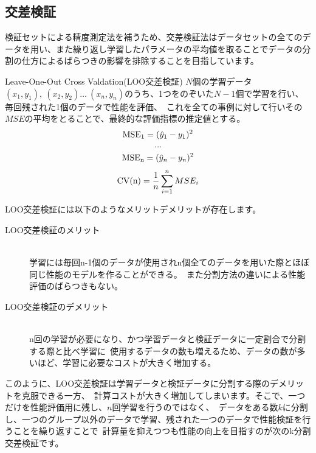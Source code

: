 \documentclass[uplatex]{jsarticle}
\begin{document}
\subsection{交差検証}
検証セットによる精度測定法を補うため、交差検証法はデータセットの全てのデータを用い、また繰り返し学習したパラメータの平均値を取ることでデータの分割の仕方によるばらつきの影響を排除することを目指しています。
\begin{itembox}[l]{Leave-One-Out Cross Valdation(LOO交差検証)}
  $N$個の学習データ${(x_1, y_1),\ (x_2, y_2) \ldots\ (x_n, y_n)}$のうち、1つをのぞいた$N-1$個で学習を行い、毎回残された1個のデータで性能を評価、\
  これを全ての事例に対して行いその$MSE$の平均をとることで、最終的な評価指標の推定値とする。\\
  $$ {\rm MSE_1} = (\hat{y}_1-y_1)^2$$
  $$\dots$$
  $$ {\rm MSE_n} = (\hat{y}_n-y_n)^2$$
  $$ {\rm CV(n)} = \frac{1}{n}\sum_{i=1}^n MSE_i$$
\end{itembox}
LOO交差検証には以下のようなメリットデメリットが存在します。
  \begin{description}
    \item [LOO交差検証のメリット]\mbox{}\\
    学習には毎回n-1個のデータが使用されn個全てのデータを用いた際とほぼ同じ性能のモデルを作ることができる。\
    また分割方法の違いによる性能評価のばらつきもない。
    \item [LOO交差検証のデメリット]\mbox{}\\
    n回の学習が必要になり、かつ学習データと検証データに一定割合で分割する際と比べ学習に\
    使用するデータの数も増えるため、データの数が多いほど、学習に必要なコストが大きく増加する。
  \end{description}

このように、LOO交差検証は学習データと検証データに分割する際のデメリットを克服できる一方、\
計算コストが大きく増加してしまいます。そこで、一つだけを性能評価用に残し、$n$回学習を行うのではなく、\
データをある数$k$に分割し、一つのグループ以外のデータで学習、残された一つのデータで性能検証を行うことを繰り返すことで\
計算量を抑えつつも性能の向上を目指すのが次のk分割交差検証です。
\end{document}
